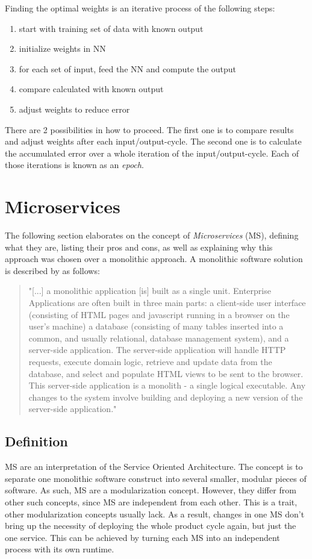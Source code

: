Finding the optimal weights is an iterative process of the following steps:
\begin{enumerate}
	\item start with training set of data with known output
	\item initialize weights in NN
	\item for each set of input, feed the NN and compute the output
	\item compare calculated with known output
	\item adjust weights to reduce error
\end{enumerate}

There are 2 possibilities in how to proceed. The first one is to compare results and adjust weights after each input/output-cycle. The second one is to calculate the accumulated error over a whole iteration of the input/output-cycle. Each of those iterations is known as an \emph{epoch}\cite{Bourg04}.


\section{Microservices}
The following section elaborates on the concept of \emph{Microservices} (MS), defining what they are, listing their pros and cons, as well as explaining why this approach was chosen over a monolithic approach. A monolithic software solution is described by \cite{Lewis14} as follows:
\begin{quotation}
	"[...] a monolithic application [is] built as a single unit. Enterprise Applications are often built in three main parts: a client-side user interface (consisting of HTML pages and javascript running in a browser on the user's machine) a database (consisting of many tables inserted into a common, and usually relational, database management system), and a server-side application. The server-side application will handle HTTP requests, execute domain logic, retrieve and update data from the database, and select and populate HTML views to be sent to the browser. This server-side application is a monolith - a single logical executable. Any changes to the system involve building and deploying a new version of the server-side application."
\end{quotation}


\subsection{Definition}
MS are an interpretation of the Service Oriented Architecture. The concept is to separate one monolithic software construct into several smaller, modular pieces of software\cite{Wolff16}. As such, MS are a modularization concept. However, they differ from other such concepts, since MS are independent from each other. This is a trait, other modularization concepts usually lack\cite{Wolff16}. As a result, changes in one MS don't bring up the necessity of deploying the whole product cycle again, but just the one service. This can be achieved by turning each MS into an independent process with its own runtime\cite{Lewis14}.

